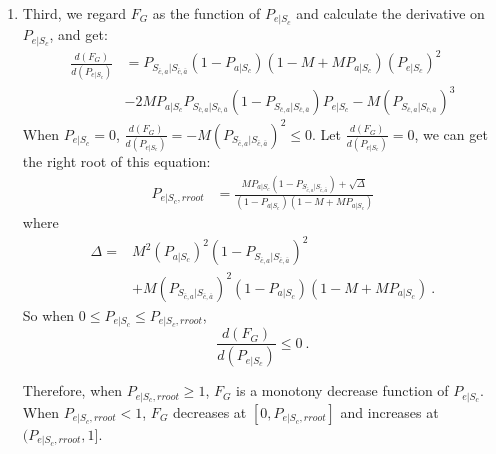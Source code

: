 \begin{enumerate}
\item
 Third, we regard $F_G$ as the function of $P_{e|S_{c}}$ and calculate the derivative on $P_{e|S_{c}}$, and get:
\begin{equation*}
\begin{split}
\frac{d(F_G)}{d(P_{e|S_{c}})} &= P_{S_{\bar{c}, a}|S_{\bar{c},\bar{a}}}(1-P_{a|S_{c}})(1-M+MP_{a|S_{c}})(P_{e|S_{c}})^2\\
&-2MP_{a|S_{c}}P_{S_{\bar{c}, a}|S_{\bar{c},\bar{a}}}(1-P_{S_{\bar{c}, a}|S_{\bar{c},\bar{a}}})P_{e|S_{c}}-M(P_{S_{\bar{c}, a}|S_{\bar{c},\bar{a}}})^3
\end{split}
\end{equation*}
When $P_{e|S_{c}} = 0$, $\frac{d(F_G)}{d(P_{e|S_{c}})} = -M(P_{S_{\bar{c}, a}|S_{\bar{c},\bar{a}}})^2 \leq 0 $.
Let $\frac{d(F_G)}{d(P_{e|S_{c}})} = 0$, we can get the right root of this equation:
\begin{equation}
\begin{split}
P_{e|S_{c},rroot} &= \frac{MP_{a|S_{c}}(1-P_{S_{\bar{c}, a}|S_{\bar{c},\bar{a}}})+\sqrt{\Delta}}{(1-P_{a|S_{c}})(1-M+MP_{a|S_{c}})}
\end{split}
\end{equation}
where
\begin{align}
\Delta = &M^{2}(P_{a|S_{c}})^{2}(1-P_{S_{\bar{c}, a}|S_{\bar{c},\bar{a}}})^2 \nonumber \\
&+ M(P_{S_{\bar{c}, a}|S_{\bar{c},\bar{a}}})^{2}(1-P_{a|S_{c}})(1-M+MP_{a|S_{c}})\  .\nonumber
\end{align}
So when
$
0 \leq P_{e|S_{c}} \leq P_{e|S_{c},rroot}
$,
$$\frac{d(F_G)}{d(P_{e|S_{c}})} \leq 0\ .$$

Therefore, when $P_{e|S_{c},rroot} \geq 1$, $F_G$ is a monotony decrease function of $P_{e|S_{c}}$.
When $P_{e|S_{c},rroot} < 1$, $F_G$ decreases at $[0,P_{e|S_{c},rroot}]$ and increases at $(P_{e|S_{c},rroot},1]$.


\end{enumerate}
